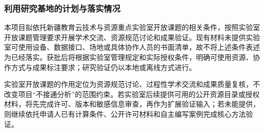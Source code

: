 \subsubsection{利用研究基地的计划与落实情况}

本项目拟依托新疆教育云技术与资源重点实验室开放课题的相关条件，按照实验室开放课题管理要求开展学术交流、资源规范讨论和成果验证。现有材料未提供实验室可使用设备、数据接口、场地或具体协作人员的书面清单，故不将上述条件表述为已经落实。获批后将根据实验室管理规定和实际授权条件，明确可使用资源、协作方式与成果标注要求；研究验证仍以本地或离线方式进行。

实验室开放课题的作用定位为资源规范讨论、过程性学术交流和成果质量复核，不改变项目“不接通分析”的范围约束。若实验室后续提供可用的公开资源目录或授权材料，将先完成许可、版本和敏感信息审查，再作为扩展验证输入；若未能提供，则继续依托申请人已有计算条件、公开许可材料和自主编写案例完成核心方法验证。
